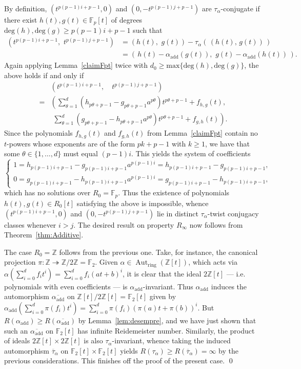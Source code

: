 \documentclass[a4paper,11pt]{amsart}
\numberwithin{equation}{section}
\theoremstyle{plain}
\theoremstyle{definition}
\newcommand{\Z}{\mathbb{Z}}
\newcommand{\F}{\mathbb{F}}
\newcommand{\anel}[1]{#1_{\text{ring}}} %
\newcommand{\addi}[1]{#1_{\text{add}}} %
\newcommand{\barra}[1]{\overline{#1}}
\newcommand{\set}[1]{\{ #1 \}}
\newcommand{\onto}{\twoheadrightarrow}
\newcommand{\Ri}{R_{\infty}} %
\DeclareMathOperator{\Aut}{Aut}
\begin{document}
By definition, $(t^{p(p-1)i+p-1},0)$ and $(0,-t^{p(p-1)j+p-1})$ are $\tau_\alpha$-conjugate if there exist $h(t), g(t) \in \F_p[t]$ of degrees $\mathrm{deg}(h),\mathrm{deg}(g) \geq {p(p-1)i+p-1}$ such that 
\begin{align*} 
(t^{p(p-1)i+p-1}, \, \, t^{p(p-1)j+p-1}) & = (h(t), \, \, g(t)) - \tau_\alpha( \, (h(t), \, g(t)) \, ) \\
 & = (\, h(t) - \addi{\alpha}(g(t)), \, \, g(t) - \addi{\alpha}(h(t)) \, ).
\end{align*}
Again applying Lemma~\ref{claimFpt} twice with $d_0 \geq \mathrm{max}\{\mathrm{deg}(h),\mathrm{deg}(g)\}$, the above holds if and only if 
\begin{align*} 
& (t^{p(p-1)i+p-1}, \quad t^{p(p-1)j+p-1}) \\
=& \left( \sum_{\theta=1}^{d} (h_{p\theta+p-1} - g_{p\theta+p-1} a^{p\theta}) t^{p\theta+p-1} + f_{h,g}(t) , \right. \\ 
& \, \, \left. \sum_{\theta=1}^{d} (g_{p\theta+p-1} -  h_{p\theta+p-1} a^{p\theta}) t^{p\theta+p-1} + f_{g,h}(t) \right).
\end{align*}
Since the polynomials $f_{h,g}(t)$ and $f_{g,h}(t)$ from Lemma~\ref{claimFpt} contain no $t$-powers whose exponents are of the form $pk+p-1$ with $k \geq 1$, we have that some $\theta \in \set{1,\ldots,d}$ must equal $(p-1)i$. This yields the system of coefficients
\[ \begin{cases}
 1 = h_{p(p-1)i+p-1} - g_{p(p-1)i+p-1}a^{p(p-1)i} = h_{p(p-1)i+p-1} - g_{p(p-1)i+p-1}, \\
 0 = g_{p(p-1)i+p-1} - h_{p(p-1)i+p-1}a^{p(p-1)i} = g_{p(p-1)i+p-1} - h_{p(p-1)i+p-1}, 
\end{cases}\]
which has no solutions over $R_0 = \F_p$. Thus the existence of polynomials $h(t), g(t) \in R_0[t]$ satisfying the above is impossible, whence $(t^{p(p-1)i+p-1},0)$ and $(0, -t^{p(p-1)j+p-1})$ lie in distinct $\tau_\alpha$-twist conjugacy classes whenever $i > j$. The desired result on property $\Ri$ now follows from Theorem~\ref{thm:Additive}. 

The case $R_0 = \Z$ follows from the previous one. Take, for instance, the canonical projection $\pi : \Z \onto \Z / 2\Z = \F_2$. Given $\alpha \in \anel{\Aut}(\Z[t])$, which acts via $\alpha(\sum_{i=0}^d f_i t^i) = \sum_{i=0}^d f_i (at+b)^i$, it is clear that the ideal $2\Z[t]$ --- i.e. polynomials with even coefficients --- is $\addi{\alpha}$-invariant. Thus $\addi{\alpha}$ induces the automorphism $\barra{\addi{\alpha}}$ on $\Z[t] / 2\Z[t] = \F_2[t]$ given by $\addi{\alpha}(\sum_{i=0}^d \pi(f_i) t^i) = \sum_{i=0}^d \pi(f_i) (\pi(a)t + \pi(b))^i$. But $R(\addi{\alpha}) \geq R(\barra{\addi{\alpha}})$ by Lemma~\ref{lem:desempre}, and we have just shown that such an $\barra{\addi{\alpha}}$ on $\F_2[t]$ has infinite Reidemeister number. Similarly, the product of ideals $2\Z[t] \times 2\Z[t]$ is also $\tau_\alpha$-invariant, whence taking the induced automorphism $\barra{\tau}_\alpha$ on $\F_2[t] \times \F_2[t]$ yields $R(\tau_\alpha) \geq R(\barra{\tau}_\alpha) = \infty$ by the previous considerations. This finishes off the proof of the present case. \qed
\end{document}
